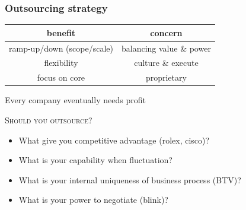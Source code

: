\documentclass[10pt,handout,notes=show]{beamer}
\begin{document}
\begin{frame}[label=outs]
  \frametitle{Outsourcing strategy \forIE}

  \begin{center} \small{
  \begin{tabular}{cc}\hline
    \textbf{benefit}                 & \textbf{concern} \\ \hline
        ramp-up/down (scope/scale)   & balancing value \& power  \\
        flexibility                  & culture \& execute \\
        focus on core                & proprietary \\ \hline
  \end{tabular} }
  \end{center}

	\NextHalfLine
  \begin{block}{}{}
    Every company eventually needs profit
  \end{block}

	\NextHalfLine
	\textsc{Should you outsource?}
  \begin{itemize}
    \item What give you competitive advantage (rolex, cisco)?
    \item What is your capability when fluctuation?
    \item What is your internal uniqueness of business process (BTV)?
    \item What is your power to negotiate (blink)? \hfill \hyperlink{stra}{}
  \end{itemize}

\end{frame}
\end{document}
